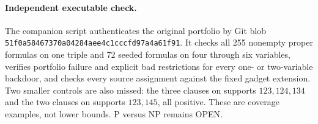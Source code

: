 \documentclass{article}
\begin{document}
\paragraph{Independent executable check.}
The companion script authenticates the original portfolio by Git blob
\texttt{51f0a58467370a04284aee4c1cccfd97a4a61f91}. It checks all 255 nonempty
proper formulas on one triple and 72 seeded formulas on four through six
variables, verifies portfolio failure and explicit bad restrictions for every
one- or two-variable backdoor, and checks every source assignment against the
fixed gadget extension. Two smaller controls are also missed: the three clauses
on supports $123,124,134$ and the two clauses on supports $123,145$, all positive.
These are coverage examples, not lower bounds. P versus NP remains OPEN.
\end{document}

